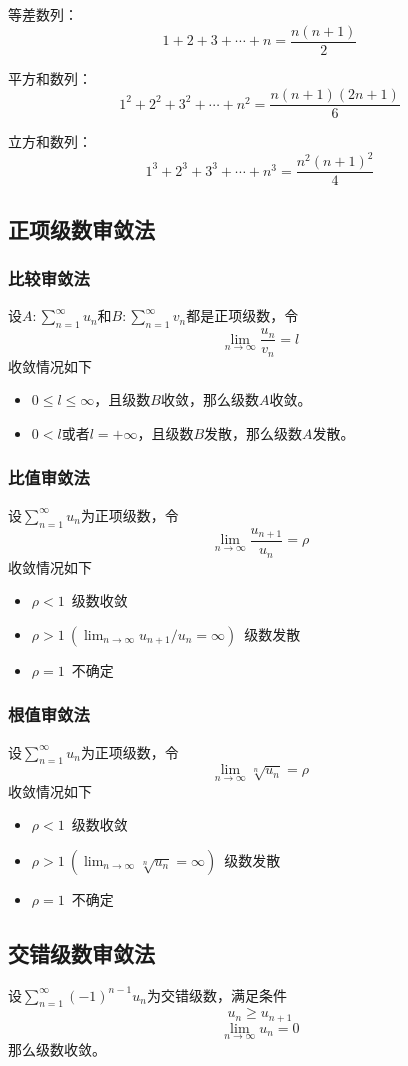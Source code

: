 等差数列：
\[1+2+3+\cdots+n=\frac{n(n+1)}{2}\]

平方和数列：
\[1^2+2^2+3^2+\cdots+n^2=\frac{n(n+1)(2n+1)}{6}\]

立方和数列：
\[1^3+2^3+3^3+\cdots+n^3=\frac{n^2(n+1)^2}{4}\]
\subsection{正项级数审敛法}
\subsubsection{比较审敛法}
设$A:\sum_{n=1}^\infty u_n$和$B:\sum_{n=1}^\infty v_n$都是正项级数，令
\[\lim_{n\to\infty}\frac{u_n}{v_n}=l\]
收敛情况如下
\begin{itemize}[nosep,left=2em]
    \item $0\le l \le \infty$，且级数$B$收敛，那么级数$A$收敛。
    \item $0<l$或者$l=+\infty$，且级数$B$发散，那么级数$A$发散。
\end{itemize}
\subsubsection{比值审敛法}
设$\sum_{n=1}^\infty u_n$为正项级数，令
\[\lim_{n\to\infty}\frac{u_{n+1}}{u_n}=\rho\]
收敛情况如下
\begin{itemize}[nosep,left=2em]
    \item $\rho<1$\ 级数收敛
    \item $\rho>1 \ (\lim_{n\to\infty}{u_{n+1}}/{u_n}=\infty)$\  级数发散
    \item $\rho=1$\ 不确定
\end{itemize}
\subsubsection{根值审敛法}
设$\sum_{n=1}^\infty u_n$为正项级数，令
\[\lim_{n\to\infty}\sqrt[n]{u_n}=\rho\]
收敛情况如下
\begin{itemize}[nosep,left=2em]
    \item $\rho<1$\ 级数收敛
    \item $\rho>1 \ (\lim_{n\to\infty}\sqrt[n]{u_n}=\infty)$\  级数发散
    \item $\rho=1$\ 不确定
\end{itemize}
\subsection{交错级数审敛法}
设$\sum_{n=1}^\infty (-1)^{n-1}u_n$为交错级数，满足条件
\[u_n\ge u_{n+1}\]
\[\lim_{n\to\infty}u_n=0\]
那么级数收敛。
